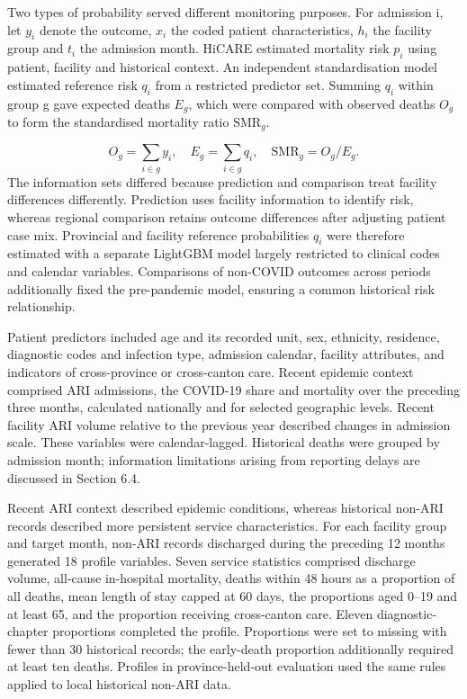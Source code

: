 \documentclass[11pt,a4paper]{article}
\newcommand{\subheading}[1]{\par\needspace{3\baselineskip}\vspace{5pt}{\bfseries #1}\par\vspace{1pt}}
\begin{document}
\subheading{S1.2 Probability references for distinct monitoring questions}
Two types of probability served different monitoring purposes. For admission i, let $y_i$ denote the outcome, $x_i$ the coded patient characteristics, $h_i$ the facility group and $t_i$ the admission month. HiCARE estimated mortality risk $p_i$ using patient, facility and historical context. An independent standardisation model estimated reference risk $q_i$ from a restricted predictor set. Summing $q_i$ within group g gave expected deaths $E_g$, which were compared with observed deaths $O_g$ to form the standardised mortality ratio $\mathrm{SMR}_g$.

\begin{equation}
O_g=\sum_{i\in g}y_i,\quad E_g=\sum_{i\in g}q_i,\quad \mathrm{SMR}_g=O_g/E_g.
\end{equation}
The information sets differed because prediction and comparison treat facility differences differently. Prediction uses facility information to identify risk, whereas regional comparison retains outcome differences after adjusting patient case mix. Provincial and facility reference probabilities $q_i$ were therefore estimated with a separate LightGBM model largely restricted to clinical codes and calendar variables. Comparisons of non-COVID outcomes across periods additionally fixed the pre-pandemic model, ensuring a common historical risk relationship.

\subheading{S1.3 Historical context and non-ARI facility profiles}
Patient predictors included age and its recorded unit, sex, ethnicity, residence, diagnostic codes and infection type, admission calendar, facility attributes, and indicators of cross-province or cross-canton care. Recent epidemic context comprised ARI admissions, the COVID-19 share and mortality over the preceding three months, calculated nationally and for selected geographic levels. Recent facility ARI volume relative to the previous year described changes in admission scale. These variables were calendar-lagged. Historical deaths were grouped by admission month; information limitations arising from reporting delays are discussed in Section 6.4.

Recent ARI context described epidemic conditions, whereas historical non-ARI records described more persistent service characteristics. For each facility group and target month, non-ARI records discharged during the preceding 12 months generated 18 profile variables. Seven service statistics comprised discharge volume, all-cause in-hospital mortality, deaths within 48 hours as a proportion of all deaths, mean length of stay capped at 60 days, the proportions aged 0–19 and at least 65, and the proportion receiving cross-canton care. Eleven diagnostic-chapter proportions completed the profile. Proportions were set to missing with fewer than 30 historical records; the early-death proportion additionally required at least ten deaths. Profiles in province-held-out evaluation used the same rules applied to local historical non-ARI data.
\end{document}
